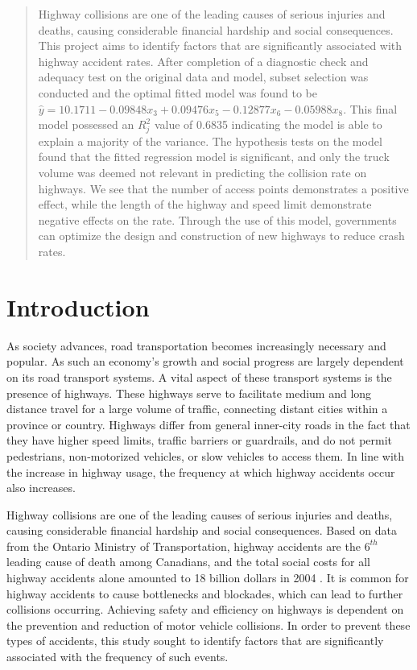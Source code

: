 \documentclass[12pt]{report}
\begin{document}

\renewcommand{\abstractname}{Abstract}
\renewcommand{\abstractnamefont}{\normalfont\Huge\bfseries}

\doublespacing
\begin{abstract}

Highway collisions are one of the leading causes of serious injuries and deaths, causing considerable financial hardship and social consequences. This project aims to identify factors that are significantly associated with highway accident rates. After completion of a diagnostic check and adequacy test on the original data and model, subset selection was conducted and the optimal fitted model was found to be $\hat{y} = 10.1711 - 0.09848x_{3} + 0.09476x_{5} - 0.12877x_{6} - 0.05988x_{8}$. This final model possessed an $R_{j}^2$ value of 0.6835 indicating the model is able to explain a majority of the variance. The hypothesis tests on the model found that the fitted regression model is significant, and only the truck volume was deemed not relevant in predicting the collision rate on highways. We see that the number of access points demonstrates a positive effect, while the length of the highway and speed limit demonstrate negative effects on the rate. Through the use of this model, governments can optimize the design and construction of new highways to reduce crash rates.
\end{abstract}

\tableofcontents

\doublespacing
\chapter{Introduction}
As society advances, road transportation becomes increasingly necessary and popular. As such an economy's growth and social progress are largely dependent on its road transport systems. A vital aspect of these transport systems is the presence of highways. These highways serve to facilitate medium and long distance travel for a large volume of traffic, connecting distant cities within a province or country. Highways differ from general inner-city roads in the fact that they have higher speed limits, traffic barriers or guardrails, and do not permit pedestrians, non-motorized vehicles, or slow vehicles to access them. In line with the increase in highway usage, the frequency at which highway accidents occur also increases.

Highway collisions are one of the leading causes of serious injuries and deaths, causing considerable financial hardship and social consequences. Based on data from the Ontario Ministry of Transportation, highway accidents are the $6^{th}$ leading cause of death among Canadians, and the total social costs for all highway accidents alone amounted to 18 billion dollars in 2004 \cite{Gov}. It is common for highway accidents to cause bottlenecks and blockades, which can lead to further collisions occurring. Achieving safety and efficiency on highways is dependent on the prevention and reduction of motor vehicle collisions. In order to prevent these types of accidents, this study sought to identify factors that are significantly associated with the frequency of such events.
\end{document}
